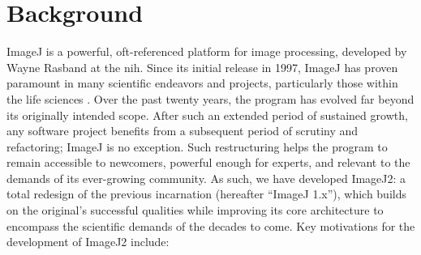 \documentclass{bmcart}
\begin{document}


\section*{Background}
ImageJ \cite{imagej_history} is a powerful, oft-referenced platform for image
processing, developed by Wayne Rasband at the \acrfull{nih}. Since its initial
release in 1997, ImageJ has proven paramount in many scientific endeavors and
projects, particularly those within the life sciences \cite{imagej_review}.
Over the past twenty years, the program has evolved far beyond its originally
intended scope. After such an extended period of sustained growth, any software
project benefits from a subsequent period of scrutiny and refactoring; ImageJ
is no exception. Such restructuring helps the program to remain accessible to
newcomers, powerful enough for experts, and relevant to the demands of its
ever-growing community. As such, we have developed ImageJ2: a total redesign of
the previous incarnation (hereafter ``ImageJ 1.x''), which builds on the
original's successful qualities while improving its core architecture to
encompass the scientific demands of the decades to come. Key motivations for
the development of ImageJ2 include:
\end{document}
